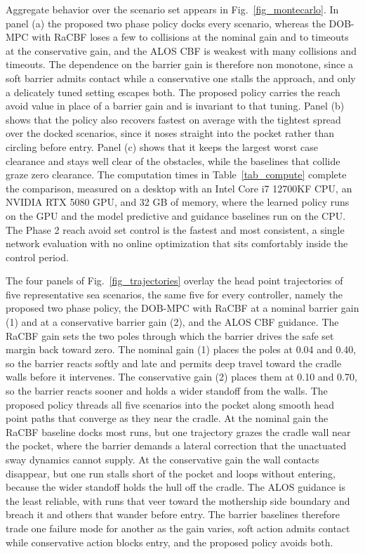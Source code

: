 \documentclass[5p,times,authoryear]{elsarticle}
\begin{document}
Aggregate behavior over the scenario set appears in Fig.~\ref{fig_montecarlo}. In panel (a) the proposed two phase policy docks every scenario, whereas the DOB-MPC with RaCBF loses a few to collisions at the nominal gain and to timeouts at the conservative gain, and the ALOS CBF is weakest with many collisions and timeouts. The dependence on the barrier gain is therefore non monotone, since a soft barrier admits contact while a conservative one stalls the approach, and only a delicately tuned setting escapes both. The proposed policy carries the reach avoid value in place of a barrier gain and is invariant to that tuning. Panel (b) shows that the policy also recovers fastest on average with the tightest spread over the docked scenarios, since it noses straight into the pocket rather than circling before entry. Panel (c) shows that it keeps the largest worst case clearance and stays well clear of the obstacles, while the baselines that collide graze zero clearance. The computation times in Table~\ref{tab_compute} complete the comparison, measured on a desktop with an Intel Core i7 12700KF CPU, an NVIDIA RTX 5080 GPU, and 32 GB of memory, where the learned policy runs on the GPU and the model predictive and guidance baselines run on the CPU. The Phase 2 reach avoid set control is the fastest and most consistent, a single network evaluation with no online optimization that sits comfortably inside the control period.

The four panels of Fig.~\ref{fig_trajectories} overlay the head point trajectories of five representative sea scenarios, the same five for every controller, namely the proposed two phase policy, the DOB-MPC with RaCBF at a nominal barrier gain (1) and at a conservative barrier gain (2), and the ALOS CBF guidance. The RaCBF gain sets the two poles through which the barrier drives the safe set margin back toward zero. The nominal gain (1) places the poles at 0.04 and 0.40, so the barrier reacts softly and late and permits deep travel toward the cradle walls before it intervenes. The conservative gain (2) places them at 0.10 and 0.70, so the barrier reacts sooner and holds a wider standoff from the walls. The proposed policy threads all five scenarios into the pocket along smooth head point paths that converge as they near the cradle. At the nominal gain the RaCBF baseline docks most runs, but one trajectory grazes the cradle wall near the pocket, where the barrier demands a lateral correction that the unactuated sway dynamics cannot supply. At the conservative gain the wall contacts disappear, but one run stalls short of the pocket and loops without entering, because the wider standoff holds the hull off the cradle. The ALOS guidance is the least reliable, with runs that veer toward the mothership side boundary and breach it and others that wander before entry. The barrier baselines therefore trade one failure mode for another as the gain varies, soft action admits contact while conservative action blocks entry, and the proposed policy avoids both.
\end{document}
